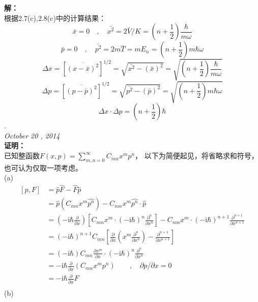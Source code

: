 \documentclass[a4paper]{article}
\begin{document}
\begin{CJK*}{UTF8}{song}
     \textbf{解：}\\[12pt]
    {
    根据2.7(c),2.8(c)中的计算结果：\\
    $$\bar{x} = 0 \quad ,
        \quad \bar{x^{2}} = 2\bar{V}/K = (n+\frac{1}{2})\frac{\hbar}{m\omega}$$
    $$\bar{p} = 0 \quad ,
        \quad \bar{p^{2}} = 2 m\bar{T} = m E_{n} = (n+\frac{1}{2}) m\hbar\omega$$
    $$\Delta x = [\overline{(x-\bar{x})^{2}}]^{1/2}
        = \sqrt{\bar{x^{2}}-(\bar{x})^{2}} = \sqrt{(n+\frac{1}{2})\frac{\hbar}{m\omega}}$$
    $$\Delta p = [\overline{(p-\bar{p})^{2}}]^{1/2}
        = \sqrt{\bar{p^{2}}-(\bar{p})^{2}} = \sqrt{(n+\frac{1}{2}) m\hbar\omega}$$
    $$\Delta x \cdot \Delta p = (n + \frac{1}{2})\hbar$$.
    }\\[20pt]
    \noindent\Large{\emph{October 20 , 2014}}\\[15pt]
     \textbf{证明：}\\[12pt]
    {
    \indent 已知整函数$F(x,p)=\sum_{m,n=0}^{\infty}C_{mn}x^{m}p^{n}$，
        以下为简便起见，将省略求和符号，也可认为仅取一项考虑。\\
    (a)
    \begin{equation}
    \begin{split}
    [p,F]   & = \hat{p}\hat{F} - \hat{F}\hat{p} \\
            & = \hat{p}(C_{mn}x^{m}\hat{p^{n}}) - C_{mn}x^{m}\hat{p^{n}}\cdot\hat{p}\\
            & = (-\mathrm{i}\hbar\frac{\partial}{\partial x})
                [C_{mn}x^{m}\cdot (-\mathrm{i}\hbar)^{n}\frac{\partial^{n}}{\partial x^{n}}]
                -C_{mn}x^{m}\cdot (-\mathrm{i}\hbar)^{n+1}\frac{\partial^{n+1}}{\partial x^{n+1}}\\
            & = (-\mathrm{i}\hbar)^{n+1}C_{mn}[
                \frac{\partial}{\partial x}(x^{m}\frac{\partial^{n}}{\partial x^{n}})
                - \frac{\partial^{n+1}}{\partial x^{n+1}}]\\
            & = (-\mathrm{i}\hbar)C_{mn}\frac{\partial x^{m}}{\partial x}
                \cdot (-\mathrm{i}\hbar)^{n}\frac{\partial^{n}}{\partial x^{n}}\\
            & = -\mathrm{i}\hbar\frac{\partial}{\partial x}(C_{mn}x^{m}p^{n})
                \qquad,\quad \partial p / \partial x = 0\\
            & = -\mathrm{i}\hbar\frac{\partial}{\partial x}F\\
    \end{split}
    \end{equation}
    (b)
}
\end{CJK*}
\end{document}
